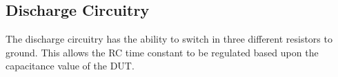 \subsection{Discharge Circuitry}
The discharge circuitry has the ability to switch in three different resistors to ground. This allows the RC time constant to be regulated based upon the capacitance value of the DUT.

